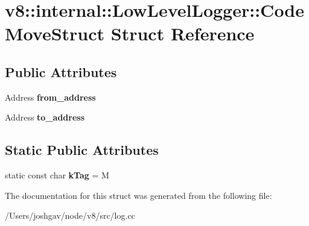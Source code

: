 \hypertarget{structv8_1_1internal_1_1_low_level_logger_1_1_code_move_struct}{}\section{v8\+:\+:internal\+:\+:Low\+Level\+Logger\+:\+:Code\+Move\+Struct Struct Reference}
\label{structv8_1_1internal_1_1_low_level_logger_1_1_code_move_struct}
\subsection*{Public Attributes}
\begin{DoxyCompactItemize}
\item 
Address {\bfseries from\+\_\+address}\hypertarget{structv8_1_1internal_1_1_low_level_logger_1_1_code_move_struct_aecf9c639d26389e1d154d00200244fd8}{}\label{structv8_1_1internal_1_1_low_level_logger_1_1_code_move_struct_aecf9c639d26389e1d154d00200244fd8}

\item 
Address {\bfseries to\+\_\+address}\hypertarget{structv8_1_1internal_1_1_low_level_logger_1_1_code_move_struct_a947fa3e584e112079164644b0e4a0312}{}\label{structv8_1_1internal_1_1_low_level_logger_1_1_code_move_struct_a947fa3e584e112079164644b0e4a0312}

\end{DoxyCompactItemize}
\subsection*{Static Public Attributes}
\begin{DoxyCompactItemize}
\item 
static const char {\bfseries k\+Tag} = \textquotesingle{}M\textquotesingle{}\hypertarget{structv8_1_1internal_1_1_low_level_logger_1_1_code_move_struct_a3c195e8013b8b023e7a62f0126540963}{}\label{structv8_1_1internal_1_1_low_level_logger_1_1_code_move_struct_a3c195e8013b8b023e7a62f0126540963}

\end{DoxyCompactItemize}


The documentation for this struct was generated from the following file\+:\begin{DoxyCompactItemize}
\item 
/\+Users/joshgav/node/v8/src/log.\+cc\end{DoxyCompactItemize}
